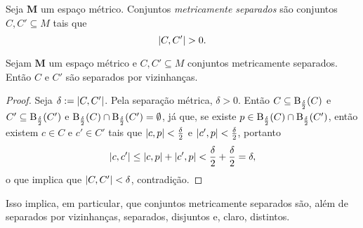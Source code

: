 \begin{definition}
Seja $\bm M$ um espaço métrico. Conjuntos \emph{metricamente separados} são conjuntos $C,C' \subseteq M$ tais que
	\begin{equation*}
	\left\vert{C},{C'}\right\vert > 0.
	\end{equation*}
\end{definition}

\begin{proposition}
Sejam $\bm M$ um espaço métrico e $C,C' \subseteq M$ conjuntos metricamente separados. Então $C$ e $C'$ são separados por vizinhanças.
\end{proposition}
\begin{proof}
Seja $\delta := \left\vert{C},{C'}\right\vert$. Pela separação métrica, $\delta > 0$. Então $C \subseteq \mathrm{B}_\frac{\delta}{2}(C)$ e $C' \subseteq \mathrm{B}_\frac{\delta}{2}(C')$ e $\mathrm{B}_\frac{\delta}{2}(C) \cap \mathrm{B}_\frac{\delta}{2}(C') = \emptyset$, já que, se existe $p \in \mathrm{B}_\frac{\delta}{2}(C) \cap \mathrm{B}_\frac{\delta}{2}(C')$, então existem $c \in C$ e $c' \in C'$ tais que $\left\vert{c},{p}\right\vert < \frac{\delta}{2}$ e $\left\vert{c'},{p}\right\vert < \frac{\delta}{2}$, portanto
	\begin{equation*}
	\left\vert{c},{c'}\right\vert \leq \left\vert{c},{p}\right\vert + \left\vert{c'},{p}\right\vert < \frac{\delta}{2}+\frac{\delta}{2} = \delta,
	\end{equation*}
o que implica que $\left\vert{C},{C'}\right\vert<\delta$, contradição.
\end{proof}

Isso implica, em particular, que conjuntos metricamente separados são, além de separados por vizinhanças, separados, disjuntos e, claro, distintos.

